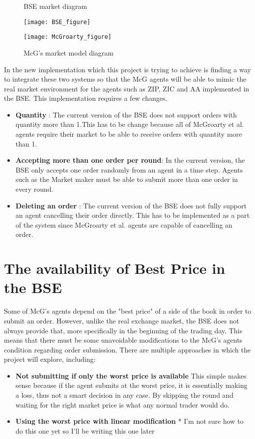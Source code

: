 \begin{figure}[h]
\caption{BSE market diagram} 
\texttt{[image: BSE\_figure]}
\caption{McG's market model diagram} 
\texttt{[image: McGroarty\_figure]}
\end{figure} 

In the new implementation which this project is trying to achieve is finding a way to integrate these two systems so that the McG agents will be able to mimic the real market environment for the agents such as ZIP, ZIC and AA implemented in the BSE. This implementation requires a few changes.

\begin{itemize}
    \item  \textbf{Quantity} : The current version of the BSE does not support orders with quantity more than 1.This has to be change because all of McGroarty et al. agents require their market to be able to receive orders with quantity more than 1. 
    \item  \textbf{Accepting more than one order per round}: In the current version, the BSE only accepts one order randomly from an agent in a time step. Agents such as the Market maker must be able to submit more than one order in every round. 
    \item \textbf{Deleting an order} : The current version of the BSE does not fully support an agent cancelling their order directly. This has to be implemented as a part of the system since McGroarty et al. agents are capable of cancelling an order.
\end{itemize} 

\section{The availability of Best Price in the BSE}
Some of McG's agents depend on the "best price" of a side of the book in order to submit an order. However, unlike the real exchange market, the BSE does not always provide that, more specifically in the beginning of the trading day. This means that there must be some unavoidable modifications to the McG's agents condition regarding order submission. There are multiple approaches in which the project will explore, including:

\begin{itemize}
    \item \textbf{Not submitting if only the worst price is available} This simple makes sense because if the agent submits at the worst price, it is essentially making a loss, thus not a smart decision in any case. By skipping the round and waiting for the right market price is what any normal trader would do. 
    
    \item \textbf{Using the worst price with linear modification} * I'm not sure how to do this one yet so I'll be writing this one later 
\end{itemize} 


%  